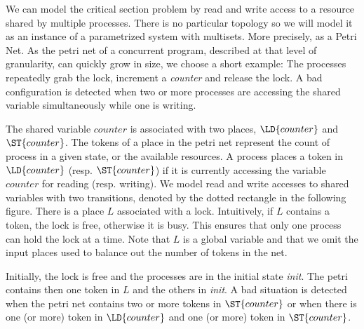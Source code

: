 %
We can model the critical section problem by read and write access to
a resource shared by multiple processes. There is no particular
topology so we will model it as an instance of a parametrized system
with multisets. More precisely, as a Petri Net.
%
As the petri net of a concurrent program, described at that level of
granularity, can quickly grow in size, we choose a short example: The
processes repeatedly grab the lock, increment a \emph{counter} and
release the lock. A bad configuration is detected when two or more
processes are accessing the shared variable simultaneously while one
is writing.

The shared variable $counter$ is associated with two places,
$\LD{counter}$ and $\ST{counter}$. The tokens of a place in the petri
net represent the count of process in a given state, or the available
resources. %
A process places a token in $\LD{counter}$ (resp. $\ST{counter}$) if
it is currently accessing the variable $counter$ for reading
(resp. writing). We model read and write accesses to shared variables
with two transitions, denoted by the dotted rectangle in the following
figure.
%
There is a place $L$ associated with a lock. Intuitively, if $L$
contains a token, the lock is free, otherwise it is busy. This ensures
that only one process can hold the lock at a time. 
%
Note that $L$ is a global variable and that we omit the input places
used to balance out the number of tokens in the net.
%

Initially, the lock is free and the processes are in the initial state
\emph{init}. The petri contains then one token in $L$ and the others
in \emph{init}. 
%
A bad situation is detected when the petri net contains two or more
tokens in $\ST{counter}$ or when there is one (or more) token in
$\LD{counter}$ and one (or more) token in $\ST{counter}$.
